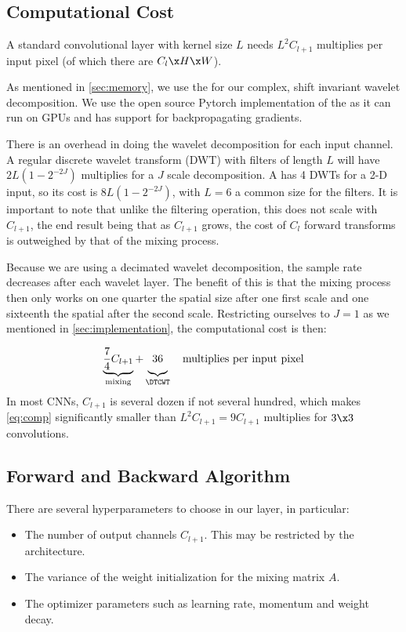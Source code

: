 \subsection{Computational Cost}\label{sec:computation}
A standard convolutional layer with kernel size $L$ needs $L^2C_{l+1}$
multiplies per input pixel (of which there are $C_{l}\x H\x W$).

As mentioned in \autoref{sec:memory}, we use the \DTCWT for our complex, shift
invariant wavelet decomposition. We use the open source Pytorch implementation
of the \DTCWT \cite{cotter_pytorch_2018} as it can run on GPUs and
has support for backpropagating gradients.

There is an overhead in doing the wavelet decomposition for each input channel. A
regular discrete wavelet transform (DWT) with filters of length $L$ will have
$2L\left(1-2^{-2J}\right)$ multiplies for a $J$ scale decomposition. A \DTCWT
has 4 DWTs for a 2-D input, so its cost is $8L\left(1-2^{-2J}\right)$, with
$L=6$ a common size for the filters. It is important to note that unlike the
filtering operation, this does not scale with $C_{l+1}$, the end result being that as
$C_{l+1}$ grows, the cost of $C_l$ forward transforms is outweighed by that of the mixing
process.

Because we are using a decimated wavelet decomposition, the sample rate decreases after each
wavelet layer. The benefit of this is that the mixing process then only works on
one quarter the spatial size after one first scale and one sixteenth the spatial
after the second scale. Restricting ourselves to $J=1$ as we mentioned in
\autoref{sec:implementation}, the computational cost is then:

\begin{equation}
  \underbrace{ \frac{7}{4}C_{l+1} }_{\textrm{mixing}} +
  \underbrace{\vphantom{\frac{7}{4}} 36}_{\textrm{\DTCWT}} \quad
  \textrm{multiplies per input pixel}\label{eq:comp}
\end{equation}
In most CNNs, $C_{l+1}$ is several dozen if not several
hundred, which makes \autoref{eq:comp} significantly smaller than
$L^2C_{l+1}=9C_{l+1}$ multiplies for $3\x 3$ convolutions.

\subsection{Forward and Backward Algorithm}
There are several hyperparameters to choose in our layer, in particular:
\begin{itemize}
  \item The number of output channels $C_{l+1}$. This may be restricted by the
    architecture.
  \item The variance of the weight initialization for the mixing matrix $A$.
  \item The optimizer parameters such as learning rate, momentum and weight
    decay.
\end{itemize}

